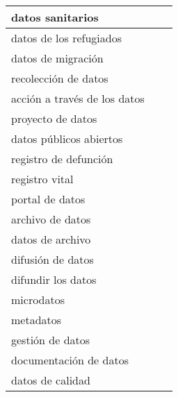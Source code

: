 \documentclass[
]{article}
\begin{document}
\begin{table}[H]
\begin{tabular}{l|l|l}
\hline
datos sanitarios &  & \\
\hline
datos de los refugiados &  & \\
\hline
datos de migración &  & \\
\hline
recolección de datos &  & \\
\hline
acción a través de los datos &  & \\
\hline
proyecto de datos &  & \\
\hline
datos públicos abiertos &  & \\
\hline
registro de defunción &  & \\
\hline
registro vital &  & \\
\hline
portal de datos &  & \\
\hline
archivo de datos &  & \\
\hline
datos de archivo &  & \\
\hline
difusión de datos &  & \\
\hline
difundir los datos &  & \\
\hline
microdatos &  & \\
\hline
metadatos &  & \\
\hline
gestión de datos &  & \\
\hline
documentación de datos &  & \\
\hline
datos de calidad &  & \\
\hline
\end{tabular}
\endgroup{}
\end{table}
\end{document}

